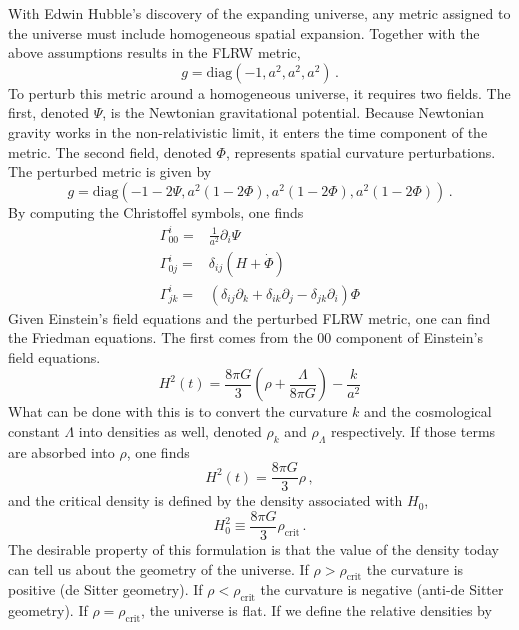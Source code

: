 With Edwin Hubble's discovery of the expanding universe, any metric assigned to the universe must include homogeneous spatial expansion. Together with the above assumptions results in the FLRW metric,
\begin{equation}
    g = \mathrm{diag}(-1,a^2,a^2,a^2)\,.
\end{equation}
To perturb this metric around a homogeneous universe, it requires two fields. The first, denoted $\Psi$, is the Newtonian gravitational potential. Because Newtonian gravity works in the non-relativistic limit, it enters the time component of the metric. The second field, denoted $\Phi$, represents spatial curvature perturbations. The perturbed metric is given by
\begin{equation}
    g = \mathrm{diag}(-1-2\Psi,a^2(1-2\Phi),a^2(1-2\Phi),a^2(1-2\Phi))\,.
\end{equation}
By computing the Christoffel symbols, one finds
\begin{equation}
    \begin{split}
        \Gamma^i_{00} =& \frac{1}{a^2}\partial_i\Psi \\
        \Gamma^i_{0j} =& \delta_{ij}(H+\dot\Phi) \\
        \Gamma^i_{jk} =& (\delta_{ij} \partial_k + \delta_{ik}\partial_j - \delta_{jk}\partial_i)\Phi
    \end{split}
\end{equation}
Given Einstein's field equations and the perturbed FLRW metric, one can find the Friedman equations. The first comes from the 00 component of Einstein's field equations.
\begin{equation}
    H^2(t) = \frac{8\pi G}{3}\left(\rho + \frac{\Lambda}{8\pi G}\right) - \frac{k}{a^2}
\end{equation}
What can be done with this is to convert the curvature $k$ and the cosmological constant $\Lambda$ into densities as well, denoted $\rho_k$ and $\rho_\Lambda$ respectively. If those terms are absorbed into $\rho$, one finds
\begin{equation}
    H^2(t) = \frac{8\pi G}{3}\rho\,,
\end{equation}
and the critical density is defined by the density associated with $H_0$,
\begin{equation}
    H_0^2 \equiv \frac{8\pi G}{3}\rho_{\mathrm{crit}}\,.
\end{equation}
The desirable property of this formulation is that the value of the density today can tell us about the geometry of the universe. If $\rho>\rho_{\mathrm{crit}}$ the curvature is positive (de Sitter geometry). If $\rho<\rho_{\mathrm{crit}}$ the curvature is negative (anti-de Sitter geometry). If $\rho=\rho_{\mathrm{crit}}$, the universe is flat. If we define the relative densities by
